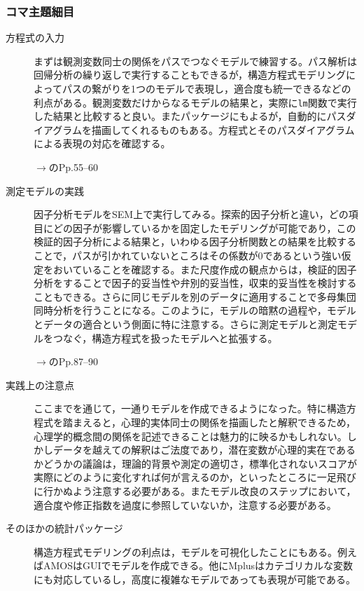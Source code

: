 \subsubsection{コマ主題細目}
\begin{description}
    \item[方程式の入力] まずは観測変数同士の関係をパスでつなぐモデルで練習する。パス解析は回帰分析の繰り返しで実行することもできるが，構造方程式モデリングによってパスの繋がりを1つのモデルで表現し，適合度も統一できるなどの利点がある。観測変数だけからなるモデルの結果と，実際に\texttt{lm}関数で実行した結果と比較すると良い。またパッケージにもよるが，自動的にパスダイアグラムを描画してくれるものもある。方程式とそのパスダイアグラムによる表現の対応を確認する。

    \begin{flushright}
        $\to$\citet{小杉考司2014-01-10}のPp.55--60
    \end{flushright}

    \item[測定モデルの実践] 因子分析モデルをSEM上で実行してみる。探索的因子分析と違い，どの項目にどの因子が影響しているかを固定したモデリングが可能であり，この検証的因子分析による結果と，いわゆる因子分析関数との結果を比較することで，パスが引かれていないところはその係数が$0$であるという強い仮定をおいていることを確認する。また尺度作成の観点からは，検証的因子分析をすることで因子的妥当性や弁別的妥当性，収束的妥当性を検討することもできる。さらに同じモデルを別のデータに適用することで多母集団同時分析を行うことになる。このように，モデルの暗黙の過程や，モデルとデータの適合という側面に特に注意する。さらに測定モデルと測定モデルをつなぐ，構造方程式を扱ったモデルへと拡張する。

    \begin{flushright}
        $\to$\citet{小杉考司2014-01-10}のPp.87--90
    \end{flushright}

    \item[実践上の注意点] ここまでを通じて，一通りモデルを作成できるようになった。特に構造方程式を踏まえると，心理的実体同士の関係を描画したと解釈できるため，心理学的概念間の関係を記述できることは魅力的に映るかもしれない。しかしデータを越えての解釈はご法度であり，潜在変数が心理的実在であるかどうかの議論は，理論的背景や測定の適切さ，標準化されないスコアが実際にどのように変化すれば何が言えるのか，といったところに一足飛びに行かぬよう注意する必要がある。またモデル改良のステップにおいて，適合度や修正指数を過度に参照していないか，注意する必要がある。

    \item[そのほかの統計パッケージ] 構造方程式モデリングの利点は，モデルを可視化したことにもある。例えばAMOSはGUIでモデルを作成できる。他にMplusはカテゴリカルな変数にも対応しているし，高度に複雑なモデルであっても表現が可能である。
\end{description}
